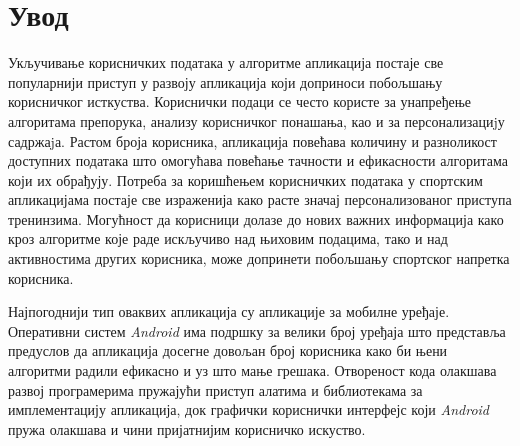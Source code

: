 \documentclass[12pt,oneside]{memoir}
\begin{document}
\frontmatter
\naslovna
\komisija
\apstrakt
\setcounter{tocdepth}{2}
\tableofcontents*

\mainmatter

\chapter{Увод}

Укључивање корисничких података у алгоритме апликација постаје све популарнији приступ у развоју апликација који доприноси побољшању корисничког исткуства. Кориснички подаци се често користе за унапређење алгоритама препорука, анализу корисничког понашања, као и за персонализациjу садржаjа. Растом броја корисника, апликација повећава количину и разноликост доступних података што омогућава повећање тачности и ефикасности алгоритама који их обрађују. Потреба за коришћењем корисничких података у спортским апликацијама постаје све израженија како расте значај персонализованог приступа тренинзима. Могућност да корисници долазе до нових важних информација како кроз алгоритме које раде искључиво над њиховим подацима, тако и над активностима других корисника, може допринети побољшању спортског напретка корисника.

Најпогоднији тип оваквих апликација су апликације за мобилне уређаје.
Оперативни систем \textit{Android} има подршку за велики број уређаја што представља предуслов да апликација досегне довољан број корисника како би њени алгоритми радили ефикасно и уз што мање грешака. Отвореност кода олакшава развој програмерима пружајући приступ алатима и библиотекама за имплементацију апликација, док графички кориснички интерфејс који \textit{Android} пружа олакшава и чини пријатнијим корисничко искуство.
\end{document}
